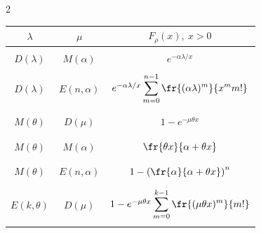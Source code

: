 \begin{multicols}{2}
\begin{table}
\begin{center}
\begin{tabular}{|c|c|c|}


\hline


$\lambda$&$\mu$&$F_\rho(x),\ x>0$\\


\hline


&&\\[-9pt]


$D(\lambda)$&$M(\alpha)$&$e^{-\alpha\lambda/x}$\\


\hline


&&\\[-9pt]


$D(\lambda)$&$E(n,\alpha)$&$e^{-\alpha\lambda/x}\displaystyle\sum\limits_{m=0}^{n-1}\fr{(\alpha\lambda)^m}{x^mm!}$\\


&&\\[-9pt]


\hline


&&\\[-9pt]


$M(\theta)$&$D(\mu)$&$1-e^{-\mu\theta x}$\\


&&\\[-9pt]


\hline


&&\\[-9pt]


$M(\theta)$&$M(\alpha)$&$\displaystyle\fr{\theta x}{\alpha+\theta x}$\\


&&\\[-9pt]


\hline


&&\\[-9pt]


$M(\theta)$&$E(n,\alpha)$&$1-\left(\displaystyle\fr{\alpha}{\alpha+\theta x}\right)^n$\\


&&\\[-9pt]


\hline


&&\\[-9pt]


$E(k,\theta)$&$D(\mu)$&$1-e^{-\mu\theta x}\displaystyle\sum\limits_{m=0}^{k-1}\displaystyle\fr{(\mu \theta x)^m}{m!}$\\


&&\\[-9pt]


\hline



\end{tabular}
\end{center}
\end{table}
\end{multicols}
